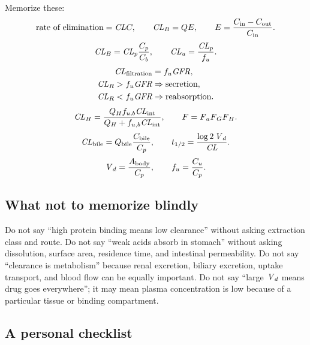 \documentclass[a4paper]{article}
\newcommand{\CL}{\ensuremath{\pksym{CL}}}
\newcommand{\CLR}{\ensuremath{\pksym{CL}_{R}}}
\newcommand{\CLH}{\ensuremath{\pksym{CL}_{H}}}
\newcommand{\CLB}{\ensuremath{\pksym{CL}_{B}}}
\newcommand{\CLp}{\ensuremath{\pksym{CL}_{p}}}
\newcommand{\CLu}{\ensuremath{\pksym{CL}_{u}}}
\newcommand{\CLint}{\ensuremath{\pksym{CL}_{\pklab{int}}}}
\newcommand{\CLbile}{\ensuremath{\pksym{CL}_{\pklab{bile}}}}
\newcommand{\Vd}{\ensuremath{\pksym{V}_d}}
\newcommand{\Fa}{\ensuremath{\pksym{F}_a}}
\newcommand{\Fg}{\ensuremath{\pksym{F}_G}}
\newcommand{\Fh}{\ensuremath{\pksym{F}_H}}
\newcommand{\Fbio}{\ensuremath{F}}
\newcommand{\fu}{\ensuremath{f_u}}
\newcommand{\fub}{\ensuremath{f_{u,b}}}
\newcommand{\GFR}{\ensuremath{\pksym{GFR}}}
\newcommand{\Qh}{\ensuremath{Q_H}}
\newcommand{\Cin}{\ensuremath{C_{\pklab{in}}}}
\newcommand{\Cout}{\ensuremath{C_{\pklab{out}}}}
\begin{document}
Memorize these:
\[
  \text{rate of elimination}=\CL C,
  \qquad
  \CLB=Q E,
  \qquad
  E=\frac{\Cin-\Cout}{\Cin}.
\]
\[
  \CLB=\CLp\frac{C_p}{C_b},
  \qquad
  \CLu=\frac{\CLp}{\fu}.
\]
\[
\begin{aligned}
  \CL_{\pklab{filtration}}&=\fu\GFR,\\
  \CLR>\fu\GFR&\Rightarrow\text{secretion},\\
  \CLR<\fu\GFR&\Rightarrow\text{reabsorption}.
\end{aligned}
\]
\[
  \CLH
  =
  \frac{\Qh\fub\CLint}{\Qh+\fub\CLint},
  \qquad
  \Fbio=\Fa\Fg\Fh.
\]
\[
  \CLbile
  =
  Q_{\pklab{bile}}\frac{C_{\pklab{bile}}}{C_p},
  \qquad
  t_{1/2}=\frac{\log 2\,\Vd}{\CL}.
\]
\[
  \Vd=\frac{A_{\pklab{body}}}{C_p},
  \qquad
  \fu=\frac{C_u}{C_p}.
\]

\subsection{What not to memorize blindly}

Do not say ``high protein binding means low clearance'' without asking extraction class and route. Do not say ``weak acids absorb in stomach'' without asking dissolution, surface area, residence time, and intestinal permeability. Do not say ``clearance is metabolism'' because renal excretion, biliary excretion, uptake transport, and blood flow can be equally important. Do not say ``large \Vd{} means drug goes everywhere''; it may mean plasma concentration is low because of a particular tissue or binding compartment.

\subsection{A personal checklist}
\end{document}
